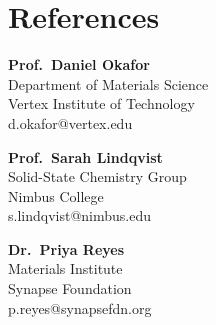 \documentclass[11pt,a4paper]{moderncv}
\begin{document}
\section{References}
\begin{minipage}[t]{0.32\textwidth}
\textbf{Prof.\ Daniel Okafor}\\
Department of Materials Science\\
Vertex Institute of Technology\\
d.okafor@vertex.edu
\end{minipage}\hfill
\begin{minipage}[t]{0.32\textwidth}
\textbf{Prof.\ Sarah Lindqvist}\\
Solid-State Chemistry Group\\
Nimbus College\\
s.lindqvist@nimbus.edu
\end{minipage}\hfill
\begin{minipage}[t]{0.32\textwidth}
\textbf{Dr.\ Priya Reyes}\\
Materials Institute\\
Synapse Foundation\\
p.reyes@synapsefdn.org
\end{minipage}
\end{document}
